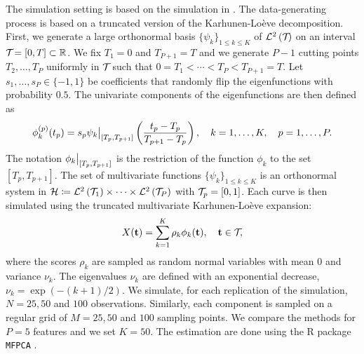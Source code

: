 The simulation setting is based on the simulation in \cite{happMultivariateFunctionalPrincipal2018a}. The data-generating process is based on a truncated version of the Karhunen-Loève decomposition. First, we generate a large orthonormal basis $\{\psi_k\}_{1 \leq k \leq K}$ of $\mathcal{L}^{2}\left(\mathcal{T}_{}\right)$ on an interval $\mathcal{T}_{} = [0, T] \subset \mathbb{R}$. We fix $T_1 = 0$ and $T_{P + 1} = T$ and we generate $P - 1$ cutting points $T_2, \dots, T_P$ uniformly in $\mathcal{T}_{}$ such that $0 = T_1 < \cdots < T_P < T_{P+1} = T$. Let $s_1, \dots, s_P \in \{-1, 1\}$ be coefficients that randomly flip the eigenfunctions with probability $0.5$. The univariate components of the eigenfunctions are then defined as
\begin{equation}\label{eq:simulation_uni_component}
    \phi_k^{(p)}(t_p) = s_p \restr{\psi_k}{[T_p, T_{p + 1}]}\left(\frac{t_p - T_p}{T_{p + 1} - T_p}\right), \quad k = 1, \dots, K, \quad p = 1, \dots, P.
\end{equation}
The notation $\restr{\phi_k}{[T_p, T_{p + 1}]}$ is the restriction of the function $\phi_k$ to the set $[T_p, T_{p + 1}]$. The set of multivariate functions $\{\psi_k\}_{1 \leq k \leq K}$ is an orthonormal system in $\mathcal{H} \coloneqq \mathcal{L}^{2}\left(\mathcal{T}_{1}\right) \times \dots \times \mathcal{L}^{2}\left(\mathcal{T}_{P}\right)$ with $\mathcal{T}_{p} = [0, 1]$. Each curve is then simulated using the truncated multivariate Karhunen-Loève expansion:
\begin{equation}
    X(\mathbf{t}) = \sum_{k = 1}^K \rho_k \phi_k(\mathbf{t}), \quad \mathbf{t} \in \mathcal{T}_{},
\end{equation}
where the scores $\rho_k$ are sampled as random normal variables with mean $0$ and variance $\nu_k$. The eigenvalues $\nu_k$ are defined with an exponential decrease, $\nu_k = \exp(-(k + 1)/2)$. We simulate, for each replication of the simulation, $N = 25, 50$ and $100$ observations. Similarly, each component is sampled on a regular grid of $M = 25, 50$ and $100$ sampling points. We compare the methods for $P = 5$ features and we set $K = 50$. The estimation are done using the \textsf{R} package \texttt{MFPCA} \citep{happ-kurzObjectOrientedSoftwareFunctional2020}.

